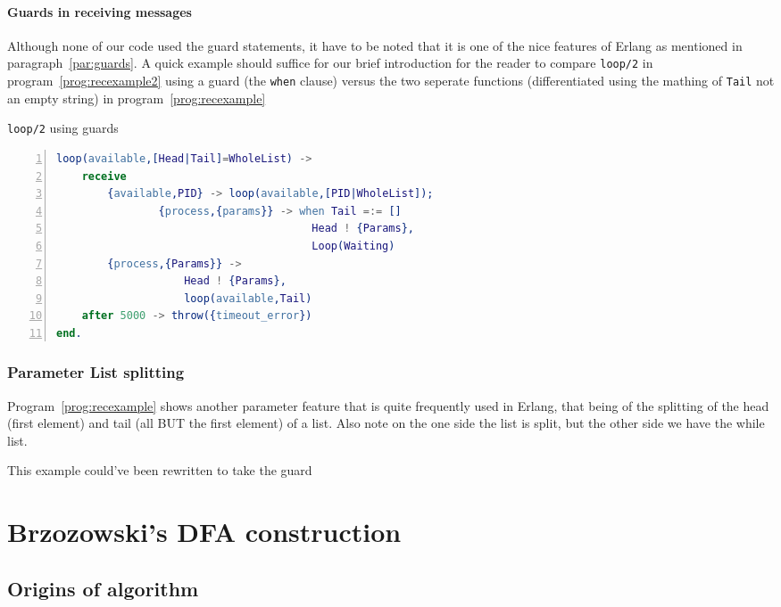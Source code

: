 \documentclass[a4paper,11pt]{report}
\begin{document}
\subsubsection{Guards in receiving messages}
\label{sec:guardRec}

Although none of our code used the guard statements, it have to be
noted that it is one of the nice features of Erlang as mentioned in
paragraph~\ref{par:guards}. A quick example should suffice for our
brief introduction for the reader to compare \texttt{loop/2} in
program~\ref{prog:recexample2} using a guard (the \texttt{when}
clause) versus the two seperate functions (differentiated using the
mathing of \texttt{Tail} not an empty string) in
program~\ref{prog:recexample}
\begin{Program}[tbh]
\caption{\texttt{loop/2} using guards}
\label{prog:recexample2}
\begin{lstlisting}[language=erlang,numbers=left,numberstyle=\tiny]
loop(available,[Head|Tail]=WholeList) ->
	receive
		{available,PID} -> loop(available,[PID|WholeList]);
                {process,{params}} -> when Tail =:= []
                                        Head ! {Params},
                                        Loop(Waiting)
		{process,{Params}} ->
					Head ! {Params},
					loop(available,Tail)
	after 5000 -> throw({timeout_error})
end.
\end{lstlisting}
\end{Program}


\subsection{Parameter List splitting}
\label{sec:listsplit}

Program~\ref{prog:recexample} shows another parameter feature that is
quite frequently used in Erlang, that being of the splitting of the
head (first element) and tail (all BUT the first element) of a
list. Also note on the one side the list is split, but the other side
we have the while list.

This example could've been rewritten to take the guard 

\chapter{Brzozowski's DFA construction}

\section{Origins of algorithm}
\label{sec:origins-algorithm}
\end{document}
